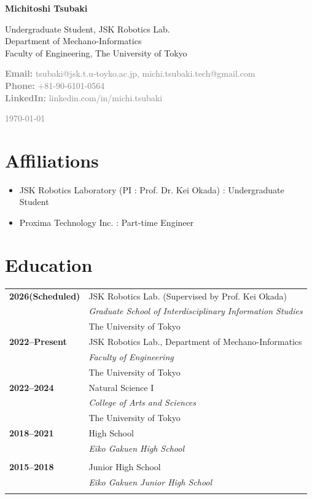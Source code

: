 \documentclass[11pt,a4paper]{article}
\newcommand{\cventry}[4]{\textbf{#1} & #2 \\ & \textit{#3} \\ & #4 \\[0.5em]}
\begin{document}
\begin{minipage}[t]{0.7\textwidth}
    \vspace{0pt}
    {\Huge\bfseries\color{darkblue} Michitoshi Tsubaki}
    \vspace{0.3cm}
    
    {\Large Undergraduate Student, JSK Robotics Lab.}\\
    Department of Mechano-Informatics\\
    Faculty of Engineering, The University of Tokyo
    \vspace{0.5cm}
    
    \textcolor{gray}{
    \textbf{Email:} tsubaki@jsk.t.u-toyko.ac.jp, michi.tsubaki.tech@gmail.com\\
    \textbf{Phone:} +81-90-6101-0564\\
    \textbf{LinkedIn:} linkedin.com/in/michi.tsubaki
    }
\end{minipage}
\hfill
\begin{minipage}[t]{0.25\textwidth}
    \vspace{0pt}
    \raggedleft
    \textcolor{gray}{\small \today}\\[0.3cm]
\end{minipage}

\vspace{1cm}

\section{Affiliations}
\begin{itemize}[leftmargin=1cm,itemsep=0.2em]
    \item JSK Robotics Laboratory (PI : Prof. Dr. Kei Okada) : Undergraduate Student
    \item Proxima Technology Inc. : Part-time Engineer
\end{itemize}

\section{Education}
\begin{tabularx}{\textwidth}{@{}p{2.5cm}X@{}}
\cventry{2026(Scheduled)}{JSK Robotics Lab. (Supervised by Prof. Kei Okada)}{Graduate School of Interdisciplinary Information Studies}{The University of Tokyo}
\cventry{2022--Present}{JSK Robotics Lab., Department of Mechano-Informatics}{Faculty of Engineering}{The University of Tokyo}
\cventry{2022--2024}{Natural Science I}{College of Arts and Sciences}{The University of Tokyo}
\cventry{2018--2021}{High School}{Eiko Gakuen High School}{}
\cventry{2015--2018}{Junior High School}{Eiko Gakuen Junior High School}{}
\end{tabularx}
\end{document}
